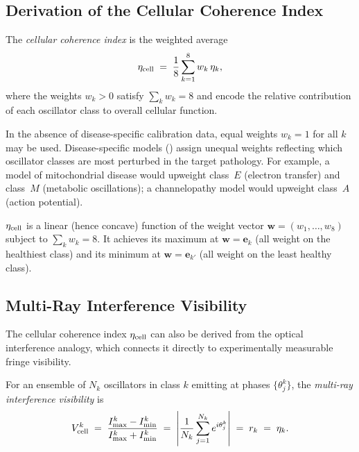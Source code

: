 \subsection{Derivation of the Cellular Coherence Index}

\begin{definition}
\label{def:coherence-index}
The \emph{cellular coherence index} is the weighted average
\begin{equation}
    \eta_{\mathrm{cell}}
    \;=\;
    \frac{1}{8}\sum_{k=1}^{8} w_k\,\eta_k,
    \label{eq:coherence-index}
\end{equation}
where the weights $w_k > 0$ satisfy $\sum_k w_k = 8$ and encode the relative
contribution of each oscillator class to overall cellular function.
\end{definition}

\begin{remark}
In the absence of disease-specific calibration data, equal weights $w_k = 1$
for all $k$ may be used.  Disease-specific models ()
assign unequal weights reflecting which oscillator classes are most perturbed
in the target pathology.  For example, a model of mitochondrial disease would
upweight class~$E$ (electron transfer) and class~$M$ (metabolic oscillations);
a channelopathy model would upweight class~$A$ (action potential).
\end{remark}

\begin{proposition}
\label{prop:eta-concave}
$\eta_{\mathrm{cell}}$ is a linear (hence concave) function of the weight vector
$\mathbf{w} = (w_1,\ldots,w_8)$ subject to $\sum_k w_k = 8$.  It achieves
its maximum at $\mathbf{w} = \mathbf{e}_k$ (all weight on the healthiest
class) and its minimum at $\mathbf{w} = \mathbf{e}_{k'}$ (all weight on the
least healthy class).
\end{proposition}

\subsection{Multi-Ray Interference Visibility}

The cellular coherence index $\eta_{\mathrm{cell}}$ can also be derived from the optical
interference analogy, which connects it directly to experimentally measurable
fringe visibility.

\begin{definition}
\label{def:Vcell}
For an ensemble of $N_k$ oscillators in class $k$ emitting at phases
$\{\theta_j^k\}$, the \emph{multi-ray interference visibility} is
\begin{equation}
    V_{\mathrm{cell}}^k
    \;=\;
    \frac{I_\mathrm{max}^k - I_\mathrm{min}^k}
         {I_\mathrm{max}^k + I_\mathrm{min}^k}
    \;=\;
    \left|\frac{1}{N_k}\sum_{j=1}^{N_k} e^{i\theta_j^k}\right|
    \;=\; r_k \;=\; \eta_k.
    \label{eq:Vcell}
\end{equation}
\end{definition}

